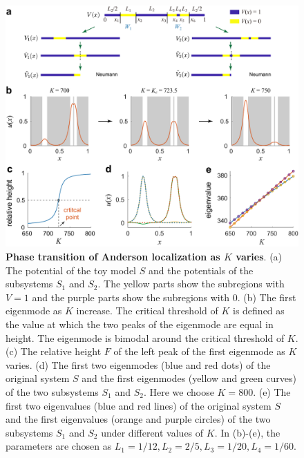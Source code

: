 \documentclass[a4paper,11pt]{article}
\begin{document}
\begin{figure}[!htb]
\centering
\includegraphics[width=\linewidth]{Fig5}
\caption{\textbf{Phase transition of Anderson localization as $K$ varies}. (a) The potential of the toy model $S$ and the potentials of the subsystems $S_1$ and $S_2$. The yellow parts show the subregions with $V = 1$ and the purple parts show the subregions with $0$. (b) The first eigenmode as $K$ increase. The critical threshold of $K$ is defined as the value at which the two peaks of the eigenmode are equal in height. The eigenmode is bimodal around the critical threshold of $K$. (c) The relative height $F$ of the left peak of the first eigenmode as $K$ varies. (d) The first two eigenmodes (blue and red dots) of the original system $S$ and the first eigenmodes (yellow and green curves) of the two subsystems $S_1$ and $S_2$. Here we choose $K = 800$. (e) The first two eigenvalues (blue and red lines) of the original system $S$ and the first eigenvalues (orange and purple circles) of the two subsystems $S_1$ and $S_2$ under different values of $K$. In (b)-(e), the parameters are chosen as $L_1 = 1/12, L_2 = 2/5, L_3= 1/20, L_4 = 1/60$.}
\label{fig5}
\end{figure}
\end{document}
